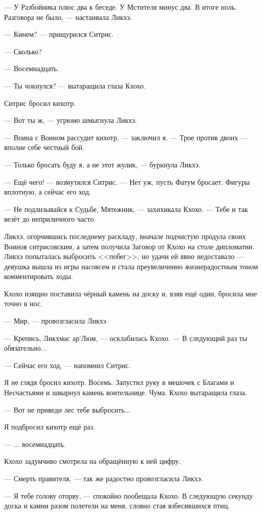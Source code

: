 --- У Разбойника плюс два к беседе.
У Мстителя минус два.
В итоге ноль.
Разговора не было, --- настаивала Ликхэ.

--- Кинем? --- прищурился Ситрис.

--- Сколько?

--- Восемнадцать.

--- Ты чокнулся? --- вытаращила глаза Кхохо.

Ситрис бросил кихотр.

--- Вот ты ж, --- угрюмо шмыгнула Ликхэ.

--- Воина с Воином рассудит кихотр, --- заключил я.
--- Трое против двоих --- вполне себе честный бой.

--- Только бросать буду я, а не этот жулик, --- буркнула Ликхэ.

--- Ещё чего! --- возмутился Ситрис.
--- Нет уж, пусть Фатум бросает.
Фигуры вплотную, а сейчас его ход.

--- Не подлизывайся к Судьбе, Мятежник, --- захихикала Кхохо.
--- Тебе и так везёт до неприличного часто.

\textspace

Ликхэ, огорчившись последнему раскладу, вначале подчистую продула своих Воинов ситрисовским, а затем получила Заговор от Кхохо на столе дипломатии.
Ликхэ попыталась выбросить <<побег>>, но удачи ей явно недоставало --- девушка вышла из игры насовсем и стала преувеличенно жизнерадостным тоном комментировать ходы.

\textspace

Кхохо изящно поставила чёрный камень на доску и, взяв ещё один, бросила мне точно в нос.

--- Мир, --- провозгласила Ликхэ.

--- Крепись, Ликхмас ар’Люм, --- осклабилась Кхохо.
--- В следующий раз ты обязательно...

--- Сейчас его ход, --- напомнил Ситрис.

Я не глядя бросил кихотр.
Восемь.
Запустил руку в мешочек с Благами и Несчастьями и швырнул камень воительнице.
Чума.
Кхохо вытаращила глаза.

--- Вот не приведи лес тебе выбросить...

Я подбросил кихотр ещё раз.

--- ... восемнадцать.

Кхохо задумчиво смотрела на обращённую к ней цифру.

--- Смерть правителя, --- так же радостно провозгласила Ликхэ.

--- Я тебе голову оторву, --- спокойно пообещала Кхохо.
В следующую секунду доска и камни разом полетели на меня, словно стая взбесившихся птиц.

